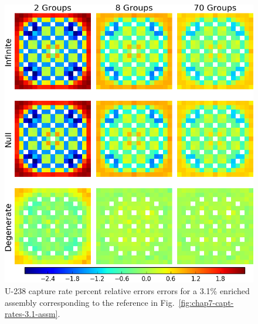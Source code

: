 \begin{appendices}
\begin{figure}[h!]
\centering
\includegraphics[width=\linewidth]{figures/quantification/appendix/assm-31/capt-err}
\vspace{2mm}
\caption[U-238 capture rate errors for a 3.1\% enriched assembly]{U-238 capture rate percent relative errors errors for a 3.1\% enriched assembly corresponding to the reference in Fig.~\ref{fig:chap7-capt-rates-3.1-assm}.}
\label{fig:quantify-assm-3.1-capt-err}
\end{figure}

\clearpage


\end{appendices}
